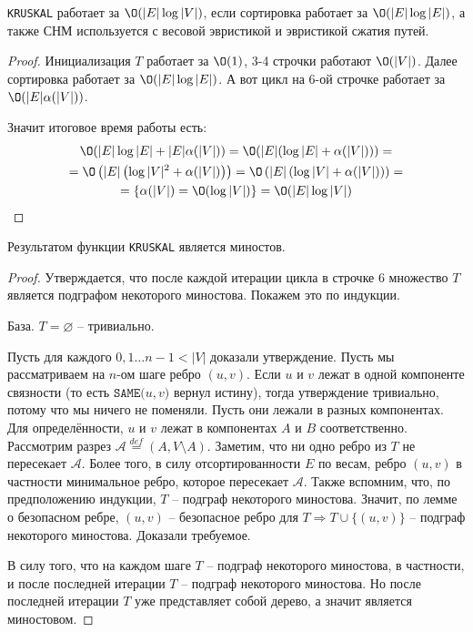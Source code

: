 \St \texttt{KRUSKAL} работает за $\O(|E| \log |V|)$, если сортировка работает за $\O(|E| \log |E|)$, а также СНМ используется с весовой эвристикой и эвристикой сжатия путей.
\begin{proof}
    
    Инициализация $T$ работает за $\O(1)$, 3-4 строчки работают $\O(|V|)$. 
    Далее сортировка работает за $\O(|E| \log |E|)$. А вот цикл на 6-ой строчке работает за $\O(|E| \alpha(|V|))$.

    Значит итоговое время работы есть:
    \begin{multline*}
        \O(|E| \log |E| + |E| \alpha(|V|)) = \O(|E| (\log |E| + \alpha(|V|))) = \\ 
        = \O\left(|E| \left(\log |V|^2 + \alpha(|V|)\right)\right) = \O\left(|E| \left(\log |V| + \alpha(|V|)\right)\right) = \\
        = \left\{ \alpha(|V|) = \O(\log |V|) \right\} = \O(|E| \log |V|)
    \end{multline*}

\end{proof}

\St Результатом функции \texttt{KRUSKAL} является миностов.
\begin{proof}
    
    Утверждается, что после каждой итерации цикла в строчке 6 множество $T$ является подграфом некоторого миностова. 
    Покажем это по индукции.

    База. $T = \varnothing$ -- тривиально.

    Пусть для каждого $0, 1 \dots n - 1 < |V|$ доказали утверждение. 
    Пусть мы рассматриваем на $n$-ом шаге ребро $(u, v)$.
    Если $u$ и $v$ лежат в одной компоненте связности (то есть $\texttt{SAME(}u, v\texttt{)}$ вернул истину), тогда утверждение тривиально, потому что мы ничего не поменяли.
    Пусть они лежали в разных компонентах. Для определённости, $u$ и $v$ лежат в компонентах $A$ и $B$ соответственно.
    Рассмотрим разрез $\mathcal{A} \overset{def}{=} (A, V \setminus A)$. 
    Заметим, что ни одно ребро из $T$ не пересекает $\mathcal{A}$.
    Более того, в силу отсортированности $E$ по весам, ребро $(u, v)$ в частности минимальное ребро, которое пересекает $\mathcal{A}$.
    Также вспомним, что, по предположению индукции, $T$ -- подграф некоторого миностова.
    Значит, по лемме о безопасном ребре, $(u, v)$ -- безопасное ребро для $T \Rightarrow T \cup \{(u, v)\}$ -- подграф некоторого миностова. Доказали требуемое.

    В силу того, что на каждом шаге $T$ -- подграф некоторого миностова, в частности, и после последней итерации $T$ -- подграф некоторого миностова. 
    Но после последней итерации $T$ уже представляет собой дерево, а значит является миностовом.

\end{proof}

